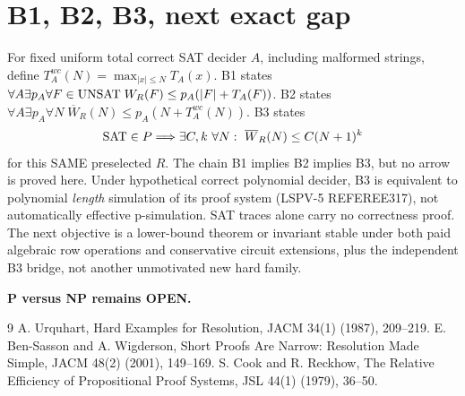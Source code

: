 \documentclass[11pt]{article}
\begin{document}
\section*{B1, B2, B3, next exact gap}
For fixed uniform total correct SAT decider $A$, including malformed strings, define $T_A^{wc}(N)=\max_{|x|\le N}T_A(x)$. B1 states $\forall A\exists p_A\forall F\in{\rm UNSAT}\;W_R(F)\le p_A(|F|+T_A(F))$. B2 states $\forall A\exists p_A\forall N\;\overline W_R(N)\le p_A(N+T_A^{wc}(N))$. B3 states
\[
 {\rm SAT}\in P\Longrightarrow \exists C,k\ \forall N:\ \overline W_R(N)\le C(N+1)^k
\]
for this SAME preselected $R$. The chain B1 implies B2 implies B3, but no arrow is proved here. Under hypothetical correct polynomial decider, B3 is equivalent to polynomial \emph{length} simulation of its proof system (LSPV-5 REFEREE317), not automatically effective p-simulation. SAT traces alone carry no correctness proof. The next objective is a lower-bound theorem or invariant stable under both paid algebraic row operations and conservative circuit extensions, plus the independent B3 bridge, not another unmotivated new hard family.

\noindent\textbf{P versus NP remains OPEN.}
\begin{thebibliography}{9}
 A. Urquhart, Hard Examples for Resolution, JACM 34(1) (1987), 209--219.
 E. Ben-Sasson and A. Wigderson, Short Proofs Are Narrow: Resolution Made Simple, JACM 48(2) (2001), 149--169.
 S. Cook and R. Reckhow, The Relative Efficiency of Propositional Proof Systems, JSL 44(1) (1979), 36--50.
\end{thebibliography}
\end{document}
